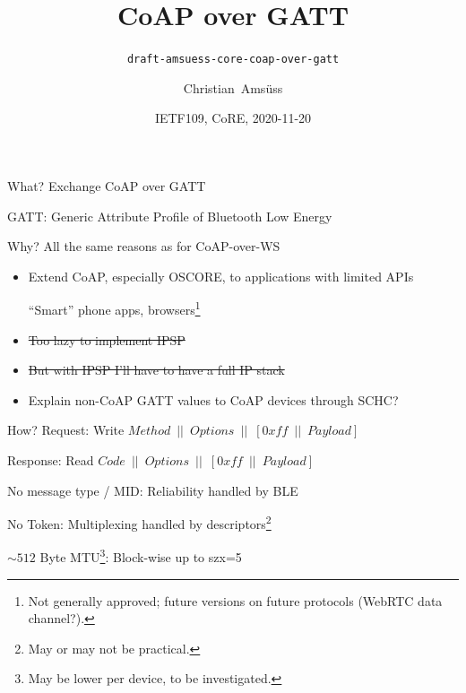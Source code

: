 \documentclass[aspectratio=169]{beamer}
\title{CoAP over GATT}
\subtitle{\texttt{draft-amsuess-core-coap-over-gatt}}
\author{Christian~Amsüss}
\date{IETF109, CoRE, 2020-11-20}
\begin{document}
\frame{\titlepage}

\begin{frame}{What?}\Large
	Exchange CoAP over GATT

	\bigskip

	GATT: Generic Attribute Profile of Bluetooth Low Energy
\end{frame}

\begin{frame}{Why?}\large
	All the same reasons as for CoAP-over-WS

	\bigskip

	\begin{itemize}
		\item Extend CoAP, especially OSCORE, to applications with limited APIs

			\bigskip

			“Smart” phone apps, browsers\footnote{Not generally approved; future versions on future protocols (WebRTC data channel?).}

			\bigskip

		\item \sout{Too lazy to implement IPSP}

		\bigskip

		\item \sout{But with IPSP I'll have to have a full IP stack}

		\bigskip

		\item Explain non-CoAP GATT values to CoAP devices through SCHC\Huge?

	\end{itemize}
\end{frame}

\begin{frame}{How?}\large
	\newcommand{\paste}{\enspace||\enspace}
	Request: Write $Method \paste  Options \paste  [0xff \paste  Payload]$

	\bigskip

	Response: Read $Code \paste  Options \paste  [0xff \paste  Payload]$

	\bigskip

	No message type / MID: Reliability handled by BLE

	\bigskip

	No Token: Multiplexing handled by descriptors\footnote{May or may not be practical.}

	\bigskip

	$\sim 512$ Byte MTU\footnote{May be lower per device, to be investigated.}: Block-wise up to szx=5
\end{frame}
\end{document}
